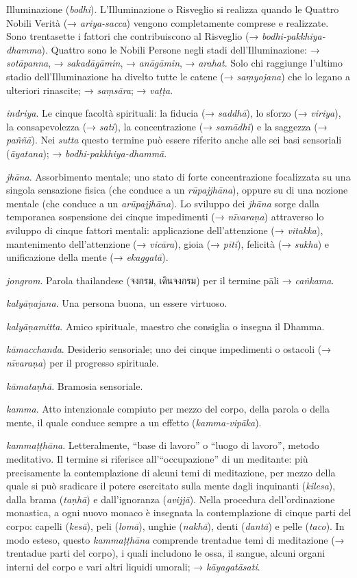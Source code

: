 Illuminazione (\emph{bodhi}). L'Illuminazione o Risveglio si realizza
quando le Quattro Nobili Verità (→ \emph{ariya-sacca}) vengono
completamente comprese e realizzate. Sono trentasette i fattori che
contribuiscono al Risveglio (→ \emph{bodhi-pakkhiya-dhamma}). Quattro
sono le Nobili Persone negli stadi dell'Illuminazione: →
\emph{sotāpanna}, → \emph{sakadāgāmin}, → \emph{anāgāmin}, →
\emph{arahat}. Solo chi raggiunge l'ultimo stadio dell'Illuminazione ha
divelto tutte le catene (→ \emph{saṃyojana}) che lo legano a ulteriori
rinascite; → \emph{saṃsāra}; → \emph{vaṭṭa}.

\emph{indriya}. Le cinque facoltà spirituali: la fiducia (→
\emph{saddhā}), lo sforzo (→ \emph{viriya}), la consapevolezza (→
\emph{sati}), la concentrazione (→ \emph{samādhi}) e la saggezza (→
\emph{paññā}). Nei \emph{sutta} questo termine può essere riferito anche
alle sei basi sensoriali (\emph{āyatana}); →
\emph{bodhi-pakkhiya-dhammā}.

\emph{jhāna}. Assorbimento mentale; uno stato di forte concentrazione
focalizzata su una singola sensazione fisica (che conduce a un
\emph{rūpajjhāna}), oppure su di una nozione mentale (che conduce a un
\emph{arūpajjhāna}). Lo sviluppo dei \emph{jhāna} sorge dalla temporanea
sospensione dei cinque impedimenti (→ \emph{nīvaraṇa}) attraverso lo
sviluppo di cinque fattori mentali: applicazione dell'attenzione (→
\emph{vitakka}), mantenimento dell'attenzione (→ \emph{vicāra}), gioia
(→ \emph{pīti}), felicità (→ \emph{sukha}) e unificazione della mente (→
\emph{ekaggatā}).

\emph{jongrom}. Parola thailandese (จงกรม, เดินจงกรม) per il termine
pāli → \emph{caṅkama}.

\emph{kalyāṇajana}. Una persona buona, un essere virtuoso.

\emph{kalyāṇamitta}. Amico spirituale, maestro che consiglia o insegna
il Dhamma.

\emph{kāmacchanda}. Desiderio sensoriale; uno dei cinque impedimenti o
ostacoli (→ \emph{nīvaraṇa}) per il progresso spirituale.

\emph{kāmataṇhā}. Bramosia sensoriale.

\emph{kamma}. Atto intenzionale compiuto per mezzo del corpo, della
parola o della mente, il quale conduce sempre a un effetto
(\emph{kamma-vipāka}).

\emph{kammaṭṭhāna}. Letteralmente, ``base di lavoro'' o ``luogo di
lavoro'', metodo meditativo. Il termine si riferisce all'``occupazione''
di un meditante: più precisamente la contemplazione di alcuni temi di
meditazione, per mezzo della quale si può sradicare il potere esercitato
sulla mente dagli inquinanti (\emph{kilesa}), dalla brama (\emph{taṇhā})
e dall'ignoranza (\emph{avijjā}). Nella procedura dell'ordinazione
monastica, a ogni nuovo monaco è insegnata la contemplazione di cinque
parti del corpo: capelli (\emph{kesā}), peli (\emph{lomā}), unghie
(\emph{nakhā}), denti (\emph{dantā}) e pelle (\emph{taco}). In modo
esteso, questo \emph{kammaṭṭhāna} comprende trentadue temi di
meditazione (→ trentadue parti del corpo), i quali includono le ossa, il
sangue, alcuni organi interni del corpo e vari altri liquidi umorali; →
\emph{kāyagatāsati}.

